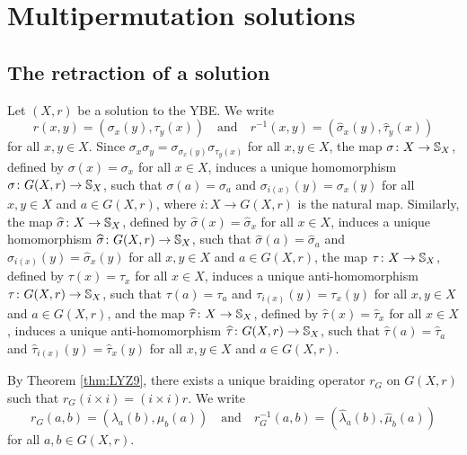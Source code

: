 \chapter{Multipermutation solutions}
\label{MP}


\section{The retraction of a solution}

Let $(X,r)$ be a solution to the YBE. We write
\[ r(x,y)=(\sigma_x(y),\tau_y(x))\quad\text{and}\quad r^{-1}(x,y)=(\widehat{\sigma}_x(y),\widehat{\tau}_y(x))\]
for all $x,y\in X$. 
Since $\sigma_x\sigma_y=\sigma_{\sigma_x(y)}\sigma_{\tau_y(x)}$ for all $x,y\in X$, the map
$\sigma\colon X\to\mathbb{S}_X$, defined by $\sigma(x)=\sigma_x$ for all $x\in X$,  induces
a unique homomorphism $\sigma\colon G(X,r)\to\mathbb{S}_X$, such that
$\sigma(a)=\sigma_a$ and $\sigma_{i(x)}(y)=\sigma_x(y)$ for all $x,y\in X$ and $a\in G(X,r)$, where $i \colon X\to G(X,r)$ is the natural map.
Similarly, the map
$\widehat{\sigma}\colon X\to\mathbb{S}_X$, defined by $\widehat{\sigma}(x)=\widehat{\sigma}_x$ for all $x\in X$,  induces
a unique homomorphism $\widehat{\sigma}\colon G(X,r)\to\mathbb{S}_X$, such that $\widehat{\sigma}(a)=\widehat{\sigma}_a$ and
$\widehat{\sigma}_{i(x)}(y)=\widehat{\sigma}_x(y)$ for all $x,y\in X$ and $a\in G(X,r)$, the map $\tau\colon X\to\mathbb{S}_X$, defined by $\tau (x)=\tau_x$ for all $x\in X$,  induces a unique anti-homomorphism $\tau\colon G(X,r)\to\mathbb{S}_X$, such that
$\tau(a)=\tau_a$ and $\tau_{i(x)}(y)=\tau_x(y)$ for all $x,y\in X$ and $a\in G(X,r)$, and the map $\widehat{\tau}\colon X\to\mathbb{S}_X$, defined by $\widehat{\tau}(x)=\widehat{\tau}_x$ for all $x\in X$,  induces a unique anti-homomorphism $\widehat{\tau}\colon G(X,r)\to\mathbb{S}_X$, such that $\widehat{\tau}(a)=\widehat{\tau}_a$ and
$\widehat{\tau}_{i(x)}(y)=\widehat{\tau}_x(y)$ for all $x,y\in X$ and $a\in G(X,r)$.

By Theorem \ref{thm:LYZ9}, there exists a unique braiding operator $r_G$ on $G(X,r)$ such that $r_G(i\times i)=(i\times i)r$.
We write 
\[r_G(a,b)=(\lambda_a(b),\mu_b(a))\quad\text{and}\quad r_G^{-1}(a,b)=(\widehat{\lambda}_a(b),\widehat{\mu}_b(a))\] 
for all $a,b\in G(X,r)$. 

